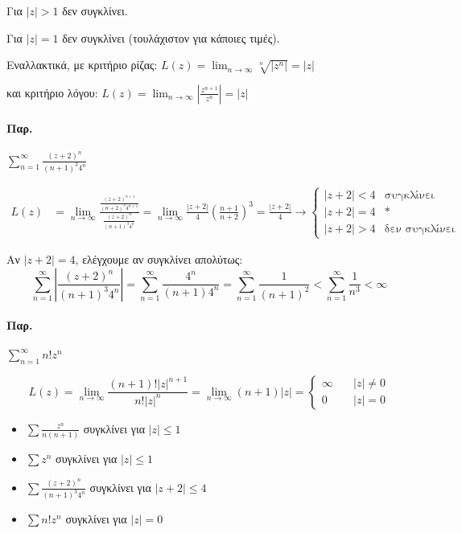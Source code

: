 \documentclass[12pt,a4paper,notitlepage,fleqn]{article}
\begin{document}
     Για \( |z|>1 \) δεν συγκλίνει.

     Για \( |z|=1 \) δεν συγκλίνει (τουλάχιστον για κάποιες τιμές).

     Εναλλακτικά, με κριτήριο ρίζας: \( L(z)=\lim_{n\to \infty}
     \sqrt[n]{\left|z^n\right|} = |z|
      \)

     και κριτήριο λόγου: \( L(z) = \lim_{n\to\infty}\left|
     \frac{z^{n+1}}{z^n}\right| =|z| \)


     \paragraph{Παρ.}
     \( \sum_{n=1}^\infty \frac{(z+2)^n}{(n+1)^3 4^n} \)

     \begin{align*}
     L(z) &= \lim_{n\to \infty}\frac{\frac{(z+2)^{n+1}}{(n+2)^3 4^{n+1}}}{
     	\frac{(z+2)^n}{(n+1)^3 4^n}
     	} = \lim_{n\to\infty} \frac{|z+2|}{4}\left(
     	\frac{n+1}{n+2}
     	\right)^3= \frac{|z+2|}{4} \to \begin{cases}
     	|z+2| < 4 & \text{συγκλίνει} \\
     	|z+2| = 4 & * \text{} \\
     	|z+2| > 4 & \text{δεν συγκλίνει}
     	\end{cases}
     \end{align*}

     Αν \( |z+2|= 4 \), ελέγχουμε αν συγκλίνει απολύτως: \[
     \sum_{n=1}^\infty \left| \frac{(z+2)^n}{(n+1)^3 4^n} \right|
     = \sum_{n=1}^\infty \frac{4^n}{(n+1) 4^n} = \sum_{n=1}^\infty
     \frac{1}{(n+1)^2} < \sum_{n=1}^\infty \frac{1}{n^3} < \infty
      \]

   \paragraph{Παρ.} \( \sum_{n=1}^\infty n!z^n \)

   \[
   L(z) = \lim_{n\to \infty} \frac{(n+1)!|z|^{n+1}}{n!|z|^n}
   = \lim_{n\to \infty}(n+1)|z|=\begin{cases}
   \infty \quad & |z| \neq 0 \\
   0 \quad & |z| = 0
   \end{cases}
   \]

  \begin{infobox}{}
     	\begin{itemize}
     		\item
     		\( \displaystyle \sum\frac{z^n}{n(n+1)} \) συγκλίνει για \( |z|\leq 1 \)
     		\item
     		\( \displaystyle \sum z^n \) συγκλίνει για \( |z|\leq 1 \)
     		\item
     		\( \displaystyle \sum \frac{(z+2)^n}{(n+1)^3 4^n} \)
     		συγκλίνει για \( |z+2| \leq 4 \)
     		\item
     		\( \displaystyle \sum n!z^n \) συγκλίνει για \( |z| = 0 \)
     	\end{itemize}
  \end{infobox}
  
\end{document}
